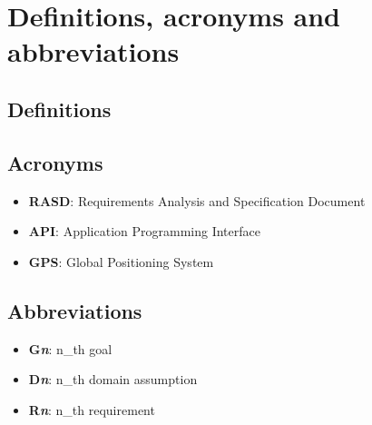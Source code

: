 \section{Definitions, acronyms and abbreviations}
\begin{itemize}
\end{itemize}

\subsection{Definitions}

\subsection{Acronyms}
\begin{itemize}
  \item \textbf{RASD}: Requirements Analysis and Specification Document
  \item \textbf{API}: Application Programming Interface
  \item \textbf{GPS}: Global Positioning System
\end{itemize}

\subsection{Abbreviations}
\begin{itemize}
  \item \textbf{G\textit{n}}: n_{th} goal
  \item \textbf{D\textit{n}}: n_{th} domain assumption
  \item \textbf{R\textit{n}}: n_{th} requirement
\end{itemize}